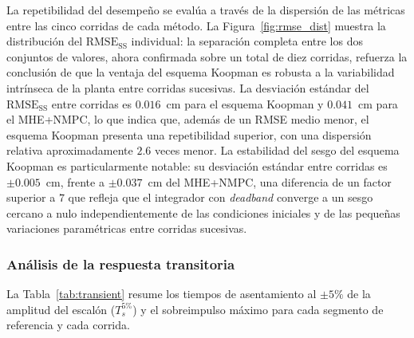 \documentclass[12pt,letterpaper]{article}
\begin{document}
La repetibilidad del desempeño se evalúa a través de la 
dispersión de las métricas entre las cinco corridas de cada 
método. La Figura~\ref{fig:rmse_dist} muestra la 
distribución del $\mathrm{RMSE}_{\mathrm{SS}}$ individual: 
la separación completa entre los dos conjuntos de valores, 
ahora confirmada sobre un total de diez corridas, refuerza la conclusión de que la ventaja del esquema 
Koopman es robusta a la variabilidad intrínseca de la planta 
entre corridas sucesivas. La desviación estándar del 
$\mathrm{RMSE}_{\mathrm{SS}}$ entre corridas es $0.016$~cm 
para el esquema Koopman y $0.041$~cm para el MHE+NMPC, lo 
que indica que, además de un RMSE medio menor, el esquema 
Koopman presenta una repetibilidad superior, con una 
dispersión relativa aproximadamente $2.6$ veces menor. La 
estabilidad del sesgo del esquema Koopman es particularmente 
notable: su desviación estándar entre corridas es 
$\pm 0.005$~cm, frente a $\pm 0.037$~cm del MHE+NMPC, una 
diferencia de un factor superior a $7$ que refleja que el 
integrador con \textit{deadband} converge a un sesgo cercano 
a nulo independientemente de las condiciones iniciales y de 
las pequeñas variaciones paramétricas entre corridas 
sucesivas.

\subsubsection{Análisis de la respuesta transitoria}
\label{sec:transitorios}

La Tabla~\ref{tab:transient} resume los tiempos de 
asentamiento al $\pm 5\%$ de la amplitud del escalón 
($T_s^{5\%}$) y el sobreimpulso máximo para cada segmento 
de referencia y cada corrida.
\end{document}
